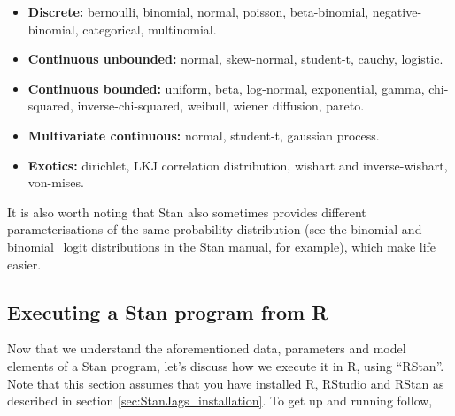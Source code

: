 \documentclass[11pt,fullpage]{book}
\begin{document}
\begin{itemize}
\item \textbf{Discrete:} bernoulli, binomial,  normal, poisson, beta-binomial, negative-binomial, categorical, multinomial.
\item \textbf{Continuous unbounded:} normal, skew-normal, student-t, cauchy, logistic.
\item\textbf{Continuous bounded:} uniform, beta, log-normal, exponential, gamma, chi-squared, inverse-chi-squared, weibull, wiener diffusion, pareto. 
\item \textbf{Multivariate continuous:} normal, student-t, gaussian process.
\item \textbf{Exotics:} dirichlet, LKJ correlation distribution, wishart and inverse-wishart, von-mises.
\end{itemize}

It is also worth noting that Stan also sometimes provides different parameterisations of the same probability distribution (see the binomial and binomial\_logit distributions in the Stan manual, for example), which make life easier. 

\subsection{Executing a Stan program from R}
Now that we understand the aforementioned data, parameters and model elements of a Stan program, let's discuss how we execute it in R, using ``RStan''. Note that this section assumes that you have installed R, RStudio and RStan as described in section \ref{sec:StanJags_installation}. To get up and running follow,
\end{document}

